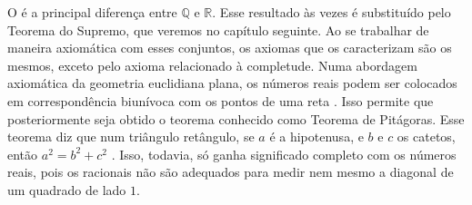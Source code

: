\documentclass[../main.tex]{subfiles}
\begin{document}
O  é a principal diferença entre $\mathbb{Q}$ e $\mathbb{R}$. Esse resultado às vezes é substituído pelo Teorema do Supremo, que veremos no capítulo seguinte. Ao se trabalhar de maneira axiomática com esses conjuntos, os axiomas que os caracterizam são os mesmos, exceto pelo axioma relacionado à completude. Numa abordagem axiomática da geometria euclidiana plana, os números reais podem ser colocados em correspondência biunívoca com os pontos de uma reta \cite[p. 16]{barbosa}. Isso permite que posteriormente seja obtido o teorema conhecido como Teorema de Pitágoras. Esse teorema diz que num triângulo retângulo, se $a$ é a hipotenusa, e $b$ e $c$ os catetos, então $a^2 = b^2 + c^2$ \cite[p. 133]{barbosa}. Isso, todavia, só ganha significado completo com os números reais, pois os racionais não são adequados para medir nem mesmo a diagonal de um quadrado de lado $1$. 
\end{document}
